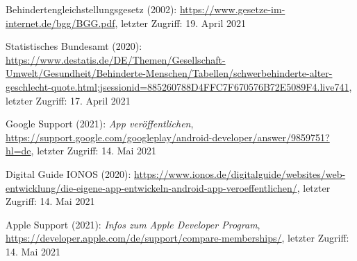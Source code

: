 \documentclass[11pt,a4paper]{article}
\begin{document}
\begin{itemize}
%
%
%
%
%



 Behindertengleichstellungsgesetz (2002): \url{https://www.gesetze-im-internet.de/bgg/BGG.pdf}, letzter Zugriff: 19. April 2021

 Statistisches Bundesamt (2020): \url{https://www.destatis.de/DE/Themen/Gesellschaft-Umwelt/Gesundheit/Behinderte-Menschen/Tabellen/schwerbehinderte-alter-geschlecht-quote.html;jsessionid=885260788D4FFC7F670576B72E5089F4.live741}, letzter Zugriff: 17. April 2021

 Google Support (2021): \textit{App veröffentlichen}, \url{https://support.google.com/googleplay/android-developer/answer/9859751?hl=de}, letzter Zugriff: 14. Mai 2021

 Digital Guide IONOS (2020): \url{https://www.ionos.de/digitalguide/websites/web-entwicklung/die-eigene-app-entwickeln-android-app-veroeffentlichen/}, letzter Zugriff: 14. Mai 2021


 Apple Support (2021): \textit{Infos zum Apple Developer Program}, \url{https://developer.apple.com/de/support/compare-memberships/}, letzter Zugriff: 14. Mai 2021
\end{itemize}
\end{document}
